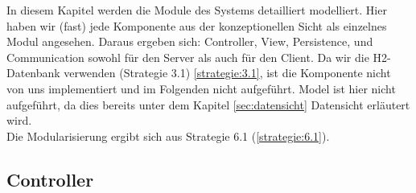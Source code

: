 \documentclass[fontsize=12pt,paper=a4,twoside]{scrartcl}
\begin{document}



In diesem Kapitel werden die Module des Systems detailliert modelliert. Hier haben wir (fast) jede Komponente aus der konzeptionellen Sicht als einzelnes Modul angesehen. Daraus ergeben sich: Controller, View, Persistence, und Communication sowohl für den Server als auch für den Client. Da wir die H2-Datenbank verwenden (Strategie 3.1) \ref{strategie:3.1}, ist die Komponente nicht von uns implementiert und im Folgenden nicht aufgeführt. Model ist hier nicht aufgeführt, da dies bereits unter dem Kapitel \ref{sec:datensicht} Datensicht erläutert wird. \\
Die Modularisierung ergibt sich aus Strategie 6.1 (\ref{strategie:6.1}).\\

\subsection{Controller}
\end{document}
